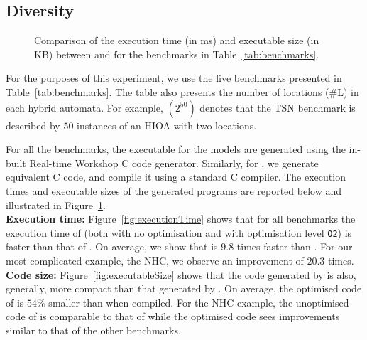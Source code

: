 \subsection{Diversity}
\label{sec:diversity}

\begin{figure}[htbp]
  \centering
  \caption{Comparison of the execution time (in ms) and executable size
    (in KB) between \simulink and \ourTool for the benchmarks in
    Table~\ref{tab:benchmarks}.}
  \label{fig:results}
\end{figure}

For the purposes of this experiment, we use the five benchmarks
presented in Table~\ref{tab:benchmarks}.  The table also presents the
number of locations (\#L) in each hybrid automata.  For example,
$(2^{50})$ denotes that the \acf{TSN} benchmark is described by $50$
instances of an \ac{HIOA} with two locations.

For all the benchmarks, the executable for the \simulink models are
generated using the in-built Real-time
Workshop\textsuperscript{\textregistered} C code generator.  Similarly,
for \ourTool, we generate equivalent C code, and compile it using a
standard C compiler.
The execution times and executable sizes of the generated programs are reported below and illustrated in Figure~\ref{fig:results}.\\

\textbf{Execution time:} Figure~\ref{fig:executionTime} shows that for
all benchmarks the execution time of \ourTool (both with no optimisation
and with optimisation level \texttt{O2}) is faster than that of
\simulink.  On average, we show that \ourTool is $9.8$ times faster than
\simulink.
For our most complicated example, the \ac{NHC}, we observe an improvement of $20.3$ times.\\

\textbf{Code size:} Figure~\ref{fig:executableSize} shows that the code
generated by \ourTool is also, generally, more compact than that
generated by \simulink.  On average, the optimised code of \ourTool is
$54\%$ smaller than \simulink when compiled.
For the \ac{NHC} example, the unoptimised code of \ourTool is comparable to that of \simulink while the optimised code sees improvements similar to that of the other benchmarks.\\

